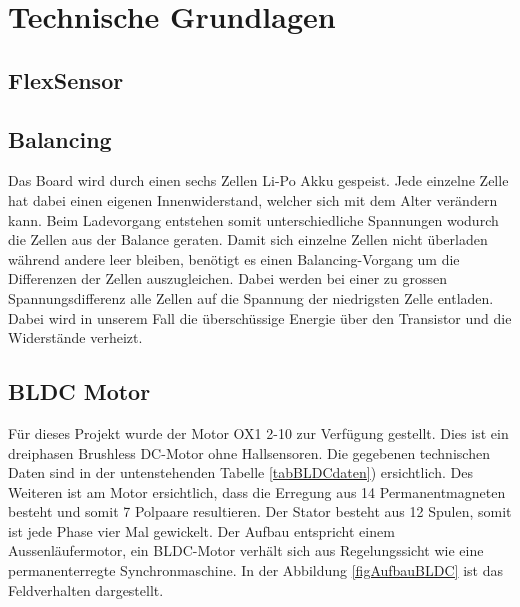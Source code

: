 \chapter{Technische Grundlagen}
\label{TechnischeGrundlagen}
\section{FlexSensor}
\label{tGl_FlexSensor}
\section{Balancing}
\label{tGl_Balancing}
Das Board wird durch einen sechs Zellen Li-Po Akku gespeist. Jede einzelne Zelle hat dabei einen eigenen Innenwiderstand, welcher sich mit dem Alter verändern kann. Beim Ladevorgang entstehen somit unterschiedliche Spannungen wodurch die Zellen aus der Balance geraten.
Damit sich einzelne Zellen nicht überladen während andere leer bleiben, benötigt es einen Balancing-Vorgang um die Differenzen der Zellen auszugleichen. 
Dabei werden bei einer zu grossen Spannungsdifferenz alle Zellen auf die Spannung der niedrigsten Zelle entladen. Dabei wird in unserem Fall die überschüssige Energie über den Transistor und die Widerstände verheizt.

\section{BLDC Motor}
\label{tGl_BLDC}

Für dieses Projekt wurde der Motor OX1 2-10 zur Verfügung gestellt. Dies ist ein dreiphasen Brushless DC-Motor ohne Hallsensoren. Die gegebenen technischen Daten sind in der untenstehenden Tabelle \ref{tabBLDCdaten}) ersichtlich. 
Des Weiteren ist am Motor ersichtlich, dass die Erregung aus 14 Permanentmagneten besteht und somit 7 Polpaare resultieren. Der Stator besteht aus 12 Spulen, somit ist jede Phase vier Mal gewickelt.
Der Aufbau entspricht einem Aussenläufermotor, ein BLDC-Motor verhält sich aus Regelungssicht wie eine permanenterregte Synchronmaschine. In der Abbildung \ref{figAufbauBLDC} ist das Feldverhalten dargestellt.\\

